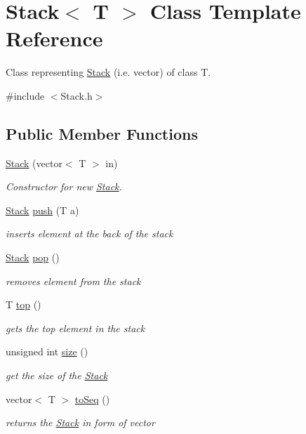 \hypertarget{class_stack}{}\section{Stack$<$ T $>$ Class Template Reference}
\label{class_stack}


Class representing \mbox{\hyperlink{class_stack}{Stack}} (i.\+e. vector) of class T.  




{\ttfamily \#include $<$Stack.\+h$>$}

\subsection*{Public Member Functions}
\begin{DoxyCompactItemize}
\item 
\mbox{\hyperlink{class_stack_a3f5265e48ea9fda2e04aa2239fa6ab01}{Stack}} (vector$<$ T $>$ in)
\begin{DoxyCompactList}\small\item\em Constructor for new \mbox{\hyperlink{class_stack}{Stack}}. \end{DoxyCompactList}\item 
\mbox{\hyperlink{class_stack}{Stack}} \mbox{\hyperlink{class_stack_a7215a80f65ed859c6cca06f76e44da88}{push}} (T a)
\begin{DoxyCompactList}\small\item\em inserts element at the back of the stack \end{DoxyCompactList}\item 
\mbox{\hyperlink{class_stack}{Stack}} \mbox{\hyperlink{class_stack_a0682e08ce3a10b12697dfd828a83268f}{pop}} ()
\begin{DoxyCompactList}\small\item\em removes element from the stack \end{DoxyCompactList}\item 
T \mbox{\hyperlink{class_stack_ad461f6de40c8672dbf743068f4515061}{top}} ()
\begin{DoxyCompactList}\small\item\em gets the top element in the stack \end{DoxyCompactList}\item 
unsigned int \mbox{\hyperlink{class_stack_ab04985802f97ae3555289c865462bf7f}{size}} ()
\begin{DoxyCompactList}\small\item\em get the size of the \mbox{\hyperlink{class_stack}{Stack}} \end{DoxyCompactList}\item 
vector$<$ T $>$ \mbox{\hyperlink{class_stack_a91a9cfa054ebcd9725b1520810ecc607}{to\+Seq}} ()
\begin{DoxyCompactList}\small\item\em returns the \mbox{\hyperlink{class_stack}{Stack}} in form of vector \end{DoxyCompactList}\end{DoxyCompactItemize}


